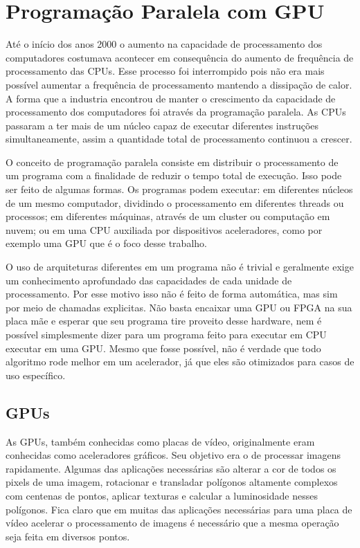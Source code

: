 \chapter{Programação Paralela com GPU}\label{chp:LABEL_CHP_3}

Até o início dos anos 2000 o aumento na capacidade de processamento dos computadores costumava acontecer em consequência do aumento de frequência de processamento das CPUs. Esse processo foi interrompido pois não era mais possível aumentar a frequência de processamento mantendo a dissipação de calor. A forma que a industria encontrou de manter o crescimento da capacidade de processamento dos computadores %
foi através da programação paralela. As CPUs passaram a ter mais de um núcleo capaz de executar diferentes instruções simultaneamente, assim a quantidade total de processamento continuou a crescer.

O conceito de programação paralela consiste em distribuir o processamento de um programa com a finalidade de reduzir o tempo total de execução. Isso pode ser feito de algumas formas. Os programas podem executar: em diferentes núcleos de um mesmo computador, dividindo o processamento em diferentes threads ou processos; em diferentes máquinas, através de um cluster ou computação em nuvem; ou em uma CPU auxiliada por dispositivos aceleradores, como por exemplo uma GPU que é o foco desse trabalho.

O uso de arquiteturas diferentes em um programa não é trivial e geralmente exige um conhecimento aprofundado das capacidades de cada unidade de processamento. Por esse motivo isso não é feito de forma automática, 
mas sim por meio de chamadas explicitas. Não basta encaixar uma GPU ou FPGA na sua placa mãe e esperar que seu programa tire proveito desse hardware, nem é possível simplesmente 
dizer para um programa feito para executar em CPU executar em uma GPU. 
Mesmo que fosse possível, não é verdade que todo algoritmo rode melhor em um acelerador, já que eles são otimizados para casos de uso específico.

\section{GPUs}
As GPUs, também conhecidas como placas de vídeo, originalmente eram conhecidas como aceleradores gráficos. Seu objetivo era o de processar imagens rapidamente. Algumas das aplicações necessárias são alterar a cor de todos os pixels de uma imagem, rotacionar e transladar polígonos altamente complexos com centenas de pontos, aplicar texturas e calcular a luminosidade nesses polígonos. 
Fica claro que em muitas das aplicações necessárias para uma placa de vídeo acelerar o processamento de imagens é necessário que a mesma operação seja feita em diversos pontos.

